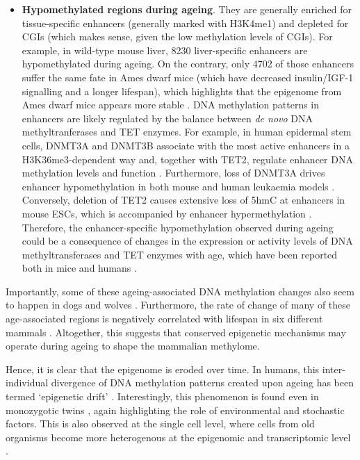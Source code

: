 \begin{itemize}
	\item \textbf{Hypomethylated regions during ageing}. They are generally enriched for tissue-specific enhancers (generally marked with H3K4me1) and depleted for \acrshort{CGI}s (which makes sense, given the low methylation levels of CGIs). For example, in wild-type mouse liver, 8230 liver-specific enhancers are hypomethylated during ageing. On the contrary, only 4702 of those enhancers suffer the same fate in Ames dwarf mice (which have decreased insulin/IGF-1 signalling and a longer lifespan), which highlights that the epigenome from Ames dwarf mice appears more stable \citep{Cole2017}. DNA methylation patterns in enhancers are likely regulated by the balance between \textit{de novo} DNA methyltranferases and TET enzymes. For example, in human epidermal stem cells, DNMT3A and DNMT3B associate with the most active enhancers in a H3K36me3-dependent way and, together with TET2, regulate enhancer DNA methylation levels and function \citep{Rinaldi2016}. Furthermore, loss of DNMT3A drives enhancer hypomethylation in both mouse and human leukaemia models \citep{Yang2016b}. Conversely, deletion of TET2 causes extensive loss of 5hmC at enhancers in mouse \acrshort{ESCs}, which is accompanied by enhancer hypermethylation \citep{Hon2014}. Therefore, the enhancer-specific hypomethylation observed during ageing could be a consequence of changes in the expression or activity levels of DNA methyltransferases and TET enzymes with age, which have been reported both in mice and humans \citep{Armstrong2013,Ciccarone2016,Gontier2018,Truong2015}.
	       
	
\end{itemize} 

Importantly, some of these ageing-associated DNA methylation changes also seem to happen in dogs and wolves \citep{Thompson2017}. Furthermore, the rate of change of many of these age-associated regions is negatively correlated with lifespan in six different mammals \citep{Lowe2018}. Altogether, this suggests that conserved epigenetic mechanisms may operate during ageing to shape the mammalian methylome.

\bigskip

Hence, it is clear that the epigenome is eroded over time. In humans, this inter-individual divergence of DNA methylation patterns created upon ageing has been termed `epigenetic drift' \citep{West2013}. Interestingly, this phenomenon is found even in monozygotic twins \citep{Fraga2005,Talens2012}, again highlighting the role of environmental and stochastic factors. This is also observed at the single cell level, where cells from old organisms become more heterogenous at the epigenomic and transcriptomic level \citep{Hernando-Herraez2018,Martinez-Jimenez2017}.

